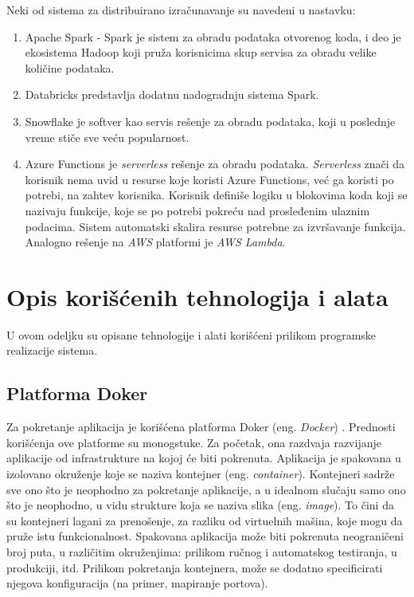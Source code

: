 \documentclass[12pt,oneside]{memoir}
\begin{document}
Neki od sistema za distribuirano izračunavanje su navedeni u nastavku:
\begin{enumerate}
\item\label{spark} Apache Spark \cite{Spark} - Spark je sistem za obradu podataka otvorenog koda, i deo je ekosistema Hadoop koji pruža korisnicima skup servisa za obradu velike količine podataka.
\item Databricks \cite{Databricks} predstavlja dodatnu nadogradnju sistema Spark.
\item Snowflake \cite{Snowflake} je softver kao servis rešenje za obradu podataka, koji u poslednje vreme stiče sve veću popularnost.
\item\label{azurefunctions} Azure Functions \cite{AzureFunctions} je \emph{serverless} rešenje za obradu podataka. \emph{Serverless} znači da korisnik nema uvid u resurse koje koristi Azure Functions, već ga koristi po potrebi, na zahtev korisnika. Korisnik definiše logiku u blokovima koda koji se nazivaju funkcije, koje se po potrebi pokreću nad prosleđenim ulaznim podacima. Sistem automatski skalira resurse potrebne za izvršavanje funkcija. Analogno rešenje na \emph{AWS} platformi je \emph{AWS Lambda}.
\end{enumerate}


\section{Opis korišćenih tehnologija i alata}

U ovom odeljku su opisane tehnologije i alati korišćeni prilikom programske realizacije sistema.

\subsection{Platforma Doker}
\label{subs:docker_platform}

Za pokretanje aplikacija je korišćena platforma Doker (eng. \emph{Docker}) \cite{Docker}. Prednosti korišćenja ove platforme su monogstuke. Za početak, ona razdvaja razvijanje aplikacije od infrastrukture na kojoj će biti pokrenuta. Aplikacija je spakovana u izolovano okruženje koje se naziva kontejner (eng. \emph{container}). Kontejneri sadrže sve ono što je neophodno za pokretanje aplikacije, a u idealnom slučaju samo ono što je neophodno, u vidu strukture koja se naziva slika (eng. \emph{image}). To čini da su kontejneri lagani za prenošenje, za razliku od virtuelnih mašina, koje mogu da pruže istu funkcionalnost. Spakovana aplikacija može biti pokrenuta neograničeni broj puta, u različitim okruženjima: prilikom ručnog i automatskog testiranja, u produkciji, itd. Prilikom pokretanja kontejnera, može se dodatno specificirati njegova konfiguracija (na primer, mapiranje portova).
\end{document}
